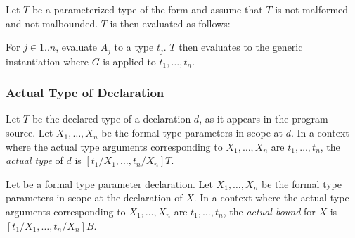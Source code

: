 \documentclass{article}
\begin{document}
\LMHash{}
Let $T$ be a parameterized type of the form
and assume that $T$ is not malformed and not malbounded.
$T$ is then evaluated as follows:

\LMHash{}
For $j \in 1 .. n$, evaluate $A_j$ to a type $t_j$.
$T$ then evaluates to the generic instantiation where $G$ is applied to $t_1, \ldots, t_n$.


\subsubsection{Actual Type of Declaration}

%

\LMHash{}
Let $T$ be the declared type of a declaration $d$,
as it appears in the program source.
Let $X_1, \ldots, X_n$ be the formal type parameters in scope at $d$.
In a context where the actual type arguments corresponding to
$X_1, \ldots, X_n$
are
$t_1, \ldots, t_n$,
the {\em actual type} of $d$ is
$[t_1/X_1, \ldots, t_n/X_n]T$.


\LMHash{}
Let  be a formal type parameter declaration.
Let
$X_1, \ldots, X_n$
be the formal type parameters in scope at the declaration of $X$.
In a context where the actual type arguments corresponding to
$X_1, \ldots, X_n$
are
$t_1, \ldots, t_n$,
the {\em actual bound} for $X$ is
$[t_1/X_1, \ldots, t_n/X_n]B$.

\end{document}
